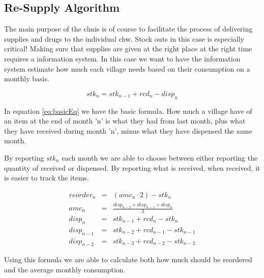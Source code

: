 \subsection{Re-Supply Algorithm}
The main purpose of the \gls{clmis} is of course to facilitate the process of delivering supplies and drugs to the individual \gls{chw}. Stock outs in this case is especially critical! Making sure that supplies are given at the right place at the right time requires a information system. In this case we want to have the information system estimate how much each village needs based on their consumption on a monthly basis. 

\begin{equation}
stk_{n} = stk_{n-1} + rcd_{n} - disp_{n}
\label{eq:basicEq}
\end{equation}

In equation \ref{eq:basicEq} we have the basic formula. How much a village have of an item at the end of month 'n' is what they had from last month, plus what they have received during month 
'n', minus what they have dispensed the same month. 

By reporting $stk_{n}$ each month we are able to choose between either reporting the quantity of received or dispensed. By reporting what is received, when received, it is easier to track the items. 

\begin{eqnarray}
reorder_{n} & = & (amc_{n} \cdot 2) - stk_{n} \\
amc_{n} & = & \frac{disp_{n-2} + disp_{n-1} + disp_{n}}{3} \\
disp_{n} & = & stk_{n-1} + rcd_{n} - stk_{n} \\
disp_{n-1} & = & stk_{n-2} + rcd_{n-1} - stk_{n-1} \\
disp_{n-2} & = & stk_{n-3} + rcd_{n-2} - stk_{n-2}
\label{eq:reorder}
\end{eqnarray}

Using this formula we are able to calculate both how much should be reordered and the average monthly consumption.


